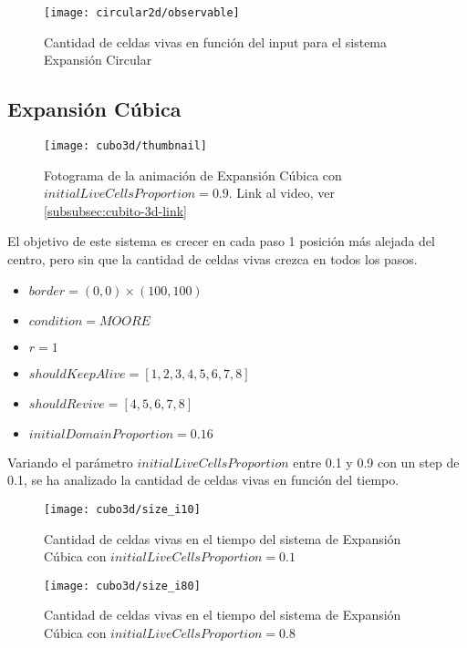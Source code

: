 \begin{figure}[H]
    \centering
    \texttt{[image: circular2d/observable]}
    \caption{Cantidad de celdas vivas en función del input para el sistema Expansión Circular}
    \label{fig:circular2d_observable}
\end{figure}


\subsection{Expansión Cúbica}\label{subsec:cubito-3D}

\begin{figure}[H]
    \centering
    \texttt{[image: cubo3d/thumbnail]}
    \caption{Fotograma de la animación de Expansión Cúbica con $initialLiveCellsProportion = 0.9$. Link al video, ver \ref{subsubsec:cubito-3d-link}}
    \label{fig:thumbnailcubo3d_i90}
\end{figure}

El objetivo de este sistema es crecer en cada paso 1 posición más alejada del centro, pero sin que la cantidad de celdas vivas crezca en todos los pasos.

\begin{itemize}
    \item $border = (0, 0) \times (100, 100)$
    \item $condition = MOORE$
    \item $r = 1$
    \item $shouldKeepAlive = [1, 2, 3, 4, 5, 6, 7, 8]$
    \item $shouldRevive = [4, 5, 6, 7, 8]$
    \item $initialDomainProportion = 0.16$
\end{itemize}

Variando el parámetro $initialLiveCellsProportion$ entre 0.1 y 0.9 con un step de 0.1, se ha analizado la cantidad de celdas vivas en función
del tiempo.

\begin{figure}[H]
    \centering
    \texttt{[image: cubo3d/size\_i10]}
    \caption{Cantidad de celdas vivas en el tiempo del sistema de Expansión Cúbica con $initialLiveCellsProportion = 0.1$}
    \label{fig:cubo3d_i10}
\end{figure}
\begin{figure}[H]
    \centering
    \texttt{[image: cubo3d/size\_i80]}
    \caption{Cantidad de celdas vivas en el tiempo del sistema de Expansión Cúbica con $initialLiveCellsProportion = 0.8$}
    \label{fig:cubo3d_i80}
\end{figure}


